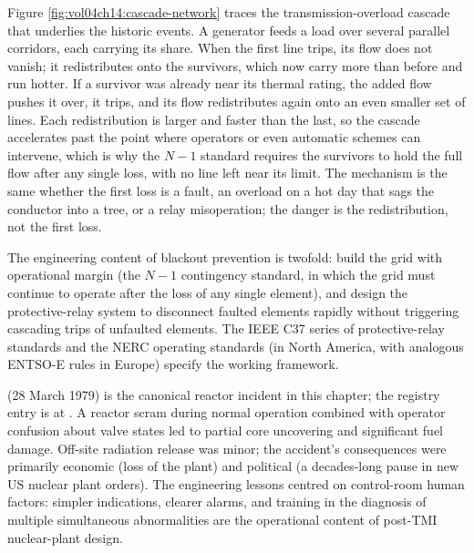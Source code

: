 Figure \ref{fig:vol04ch14:cascade-network} traces the transmission-overload
cascade that underlies the historic events. A generator feeds a load over
several parallel corridors, each carrying its share. When the first line
trips, its flow does not vanish; it redistributes onto the survivors, which
now carry more than before and run hotter. If a survivor was already near its
thermal rating, the added flow pushes it over, it trips, and its flow
redistributes again onto an even smaller set of lines. Each redistribution is
larger and faster than the last, so the cascade accelerates past the point
where operators or even automatic schemes can intervene, which is why the
$N-1$ standard requires the survivors to hold the full flow after any single
loss, with no line left near its limit. The mechanism is the same whether the
first loss is a fault, an overload on a hot day that sags the conductor into a
tree, or a relay misoperation; the danger is the redistribution, not the first
loss.



The engineering content of blackout prevention is twofold: build the
grid with operational margin (the $N-1$ contingency standard, in
which the grid must continue to operate after the loss of any single
element), and design the protective-relay system to disconnect
faulted elements rapidly without triggering cascading trips of
unfaulted elements. The IEEE C37 series of protective-relay standards
and the NERC operating standards (in North America, with analogous
ENTSO-E rules in Europe) specify the working framework.

 (28 March 1979) is the canonical reactor
incident in this chapter; the registry entry is at
\cite{acc:kemeny-tmi-1979}. A reactor scram during normal operation
combined with operator confusion about valve states led to partial
core uncovering and significant fuel damage. Off-site radiation
release was minor; the accident's consequences were primarily
economic (loss of the plant) and political (a decades-long pause in
new US nuclear plant orders). The engineering lessons centred on
control-room human factors: simpler indications, clearer alarms, and
training in the diagnosis of multiple simultaneous abnormalities are
the operational content of post-TMI nuclear-plant design.

